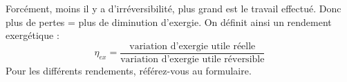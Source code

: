 	Forcément, moins il y a d'irréversibilité, plus grand est le travail effectué. Donc 
	plus de pertes = plus de diminution d'exergie. On définit ainsi un rendement exergétique :
	\begin{equation}
	\eta_{ex} = \dfrac{\text{variation d'exergie utile réelle}}{\text{variation d'exergie 
	utile réversible}}
	\end{equation}
	Pour les différents rendements, référez-vous au formulaire.
		
		
		
		
		
		
		
		
		
		
		
		
		
		
		
		
		
		
		
		
		
		
		
		
		
		
		
		
		
		
		
		
		
		
		
		
		
		
		
		
		
		
		
		
